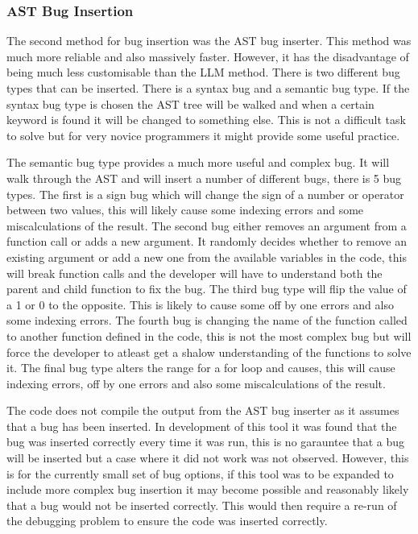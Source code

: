 \documentclass[12pt]{extarticle}
\begin{document}
\subsubsection{AST Bug Insertion}

The second method for bug insertion was the AST bug inserter. This method was much more reliable and also massively faster. However, it has the disadvantage of being much less customisable than the LLM method. There is two different bug types that can be inserted. There is a syntax bug and a semantic bug type. If the syntax bug type is chosen the AST tree will be walked and when a certain keyword is found it will be changed to something else. This is not a difficult task to solve but for very novice programmers it might provide some useful practice.

The semantic bug type provides a much more useful and complex bug. It will walk through the AST and will insert a number of different bugs, there is 5 bug types. The first is a sign bug which will change the sign of a number or operator between two values, this will likely cause some indexing errors and some miscalculations of the result. The second bug either removes an argument from a function call or adds a new argument. It randomly decides whether to remove an existing argument or add a new one from the available variables in the code, this will break function calls and the developer will have to understand both the parent and child function to fix the bug. The third bug type will flip the value of a 1 or 0 to the opposite. This is likely to cause some off by one errors and also some indexing errors. The fourth bug is changing the name of the function called to another function defined in the code, this is not the most complex bug but will force the developer to atleast get a shalow understanding of the functions to solve it. The final bug type alters the range for a for loop and causes, this will cause indexing errors, off by one errors and also some miscalculations of the result.

The code does not compile the output from the AST bug inserter as it assumes that a bug has been inserted. In development of this tool it was found that the bug was inserted correctly every time it was run, this is no garauntee that a bug will be inserted but a case where it did not work was not observed. However, this is for the currently small set of bug options, if this tool was to be expanded to include more complex bug insertion it may become possible and reasonably likely that a bug would not be inserted correctly. This would then require a re-run of the debugging problem to ensure the code was inserted correctly.
\end{document}
